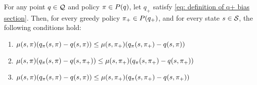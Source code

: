 \begin{lemma}
\label{thm: all inequalities when switching policy}



For any point $q \in \mathcal{Q}$ and policy $\pi \in P(q)$,
let $q_+$ satisfy \eqref{eq: definition of q+ bias section}.
Then, for every greedy policy $\pi_+ \in P(q_+)$,
and for every state $s \in \mathcal{S}$, the following conditions hold:
\vspace{-0.4cm}
\begin{enumerate}
    \item 
    $\mu(s, \pi) ( q_{\pi}(s, \pi) - q(s, \pi) )
    \leq
    \mu(s, \pi_+) ( q_{\pi}(s, \pi_+) - q(s, \pi) )$

    \item 
    $\mu(s, \pi) ( q_{\pi}(s, \pi) - q(s, \pi_+) ) 
    \leq
    \mu(s, \pi_+) ( q_{\pi}(s, \pi_+) - q(s, \pi_+) )$

    \item 
    $\mu(s, \pi) ( q_{\pi}(s, \pi) - q(s, \pi) ) 
    \leq
    \mu(s, \pi_+) ( q_{\pi}(s, \pi_+) - q(s, \pi_+) )$
\end{enumerate}
\end{lemma}
